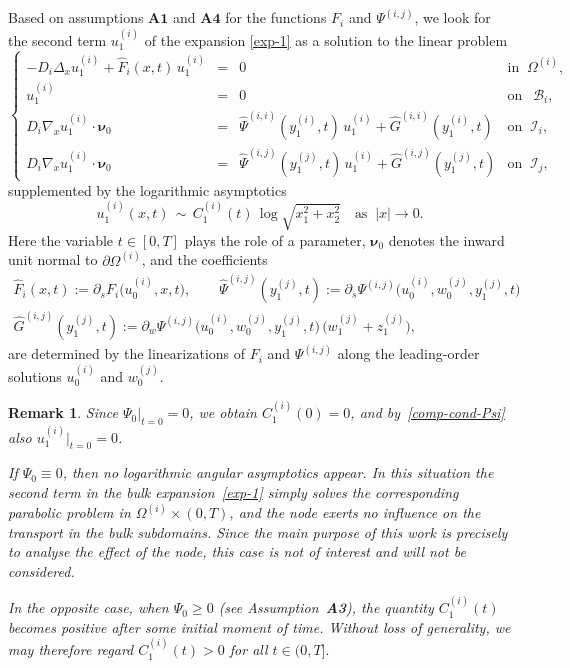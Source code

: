 \documentclass[reqno]{amsart}            %
\newtheorem{remark}{Remark}[section]
\numberwithin{equation}{section}
\begin{document}
	
	Based on assumptions $\mathbf{A1}$ and $\mathbf{A4}$ for the functions $F_i$ and $\Psi^{(i,j)}$, 
	we look for  the second term  $u_1^{(i)}$ of the expansion \eqref{exp-1} as a solution to the linear problem
	\begin{equation}\label{bulk-term-1}
		\left\{
		\begin{array}{rcll}
			- D_i \Delta_x u^{(i)}_1
			+ \widehat{F}_i(x,t) \, u^{(i)}_1 &=& 0
			& \text{in }\ \Omega^{(i)},
			\\[2mm]
			u^{(i)}_1 &=& 0
			& \text{on } \ \ \mathcal{B}_i,
			\\[2mm]
			D_i\nabla_x u^{(i)}_1\cdot\boldsymbol{\nu}_0
			&=& \widehat{\Psi}^{(i,i)}(y^{(i)}_1,t)\, u^{(i)}_1 + \widehat{G}^{(i,i)}(y^{(i)}_1,t)
			& \text{on } \ \mathcal{I}_i,
			\\[2mm]
			D_i\nabla_x u^{(i)}_1\cdot\boldsymbol{\nu}_0
			&=& \widehat{\Psi}^{(i,j)}(y^{(j)}_1,t)\, u^{(i)}_1 + \widehat{G}^{(i,j)}(y^{(j)}_1,t)
			& \text{on } \ \mathcal{I}_j,			
		\end{array}
		\right.
	\end{equation}
	supplemented by the logarithmic asymptotics
	\begin{equation}\label{log-sol}
		u^{(i)}_1(x,t) \, \sim \, 
		C^{(i)}_1(t)\, \log\sqrt{x_1^2+x_2^2} \quad \text{as } \ |x|\to 0.
	\end{equation}
	Here the variable $t\in [0,T]$ plays the role of a parameter, $\boldsymbol{\nu}_0$ denotes
	the inward unit normal to $\partial\Omega^{(i)}$, and the coefficients
	\begin{gather*}
		\widehat{F}_i(x,t) := \partial_s F_i\big(u^{(i)}_0,x,t\big)  , \qquad \widehat{\Psi}^{(i,j)}(y^{(j)}_1,t) := \partial_s \Psi^{(i,j)}\big(u^{(i)}_0,w^{(j)}_0,y^{(j)}_1,t\big)
		\\
		\widehat{G}^{(i,j)}(y^{(j)}_1,t) := \partial_w \Psi^{(i,j)}\big(u^{(i)}_0,w^{(j)}_0,y^{(j)}_1,t\big)\, \big(w_1^{(j)}  + z_1^{(j)} \big),	
	\end{gather*}
	are determined by the linearizations of $F_i$ and $\Psi^{(i,j)}$ along the leading-order solutions $u_0^{(i)}$ and $w_0^{(j)}$.
	
	
	\begin{remark}\label{rem-2-6}
		Since $\Psi_0|_{t=0}=0$, we obtain $C^{(i)}_1(0)=0$, and by~\eqref{comp-cond-Psi} also $u^{(i)}_1|_{t=0}=0$.
		
		If $\Psi_0 \equiv 0$, then no logarithmic angular asymptotics appear. In this situation the second term in the bulk expansion~\eqref{exp-1} simply solves the corresponding parabolic problem in $\Omega^{(i)} \times (0,T)$, and the node exerts no influence on the transport in the bulk subdomains. Since the main purpose of this work is precisely to analyse the effect of the node, this case is not of interest and will not be considered.
		
		In the opposite case, when $\Psi_0 \ge 0$ (see Assumption~{\bf A3}), the quantity $C^{(i)}_1(t)$ becomes positive after some initial moment of time. Without loss of generality, we may therefore regard $C^{(i)}_1(t) > 0$ for all $t \in (0,T].$
	\end{remark}
	
\end{document}
